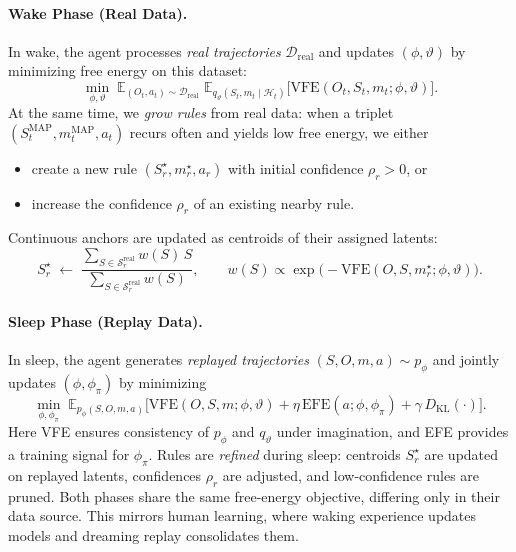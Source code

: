 \documentclass{article} %
\begin{document}
\paragraph{Wake Phase (Real Data).}
In wake, the agent processes \emph{real trajectories} $\mathcal D_{\mathrm{real}}$ and updates 
$(\phi,\vartheta)$ by minimizing free energy on this dataset:
{\small\[
\min_{\phi,\vartheta}\; 
\mathbb{E}_{(O_t,a_t)\sim \mathcal D_{\mathrm{real}}}\;
\mathbb{E}_{q_\vartheta(S_t,m_t\mid \mathcal H_t)}
\big[\text{VFE}(O_t,S_t,m_t;\phi,\vartheta)\big].
\]}
At the same time, we \emph{grow rules} from real data: when a triplet 
$(S_t^{\mathrm{MAP}}, m_t^{\mathrm{MAP}}, a_t)$ recurs often and yields low free energy, we either  
\begin{itemize}
\item[(i)] create a new rule $(S_r^\star, m_r^\star, a_r)$ with initial confidence $\rho_r>0$, or  
\item[(ii)] increase the confidence $\rho_r$ of an existing nearby rule.  
\end{itemize}

Continuous anchors are updated as centroids of their assigned latents:
{\small\[
S_r^\star \;\leftarrow\; 
\frac{\sum_{S \in \mathcal S_r^{\mathrm{real}}} w(S)\,S}
     {\sum_{S \in \mathcal S_r^{\mathrm{real}}} w(S)},
\qquad
w(S) \propto \exp\!\big(-\text{VFE}(O,S,m_r^\star;\phi,\vartheta)\big).
\]}
\paragraph{Sleep Phase (Replay Data).}
In sleep, the agent generates \emph{replayed trajectories} $(S,O,m,a)\sim p_\phi$ and jointly updates 
$(\phi,\phi_\pi)$ by minimizing
{\small \[
\min_{\phi,\phi_\pi}\; 
\mathbb{E}_{p_\phi(S,O,m,a)}\Big[ 
\text{VFE}(O,S,m;\phi,\vartheta) + \eta\,\text{EFE}(a;\phi,\phi_\pi) 
+ \gamma\, D_{\mathrm{KL}}(\cdot) \Big].
\]}
Here VFE ensures consistency of $p_\phi$ and $q_\vartheta$ under imagination, and EFE provides a training 
signal for $\phi_\pi$.  
Rules are \emph{refined} during sleep: centroids $S_r^\star$ are updated on replayed latents, confidences 
$\rho_r$ are adjusted, and low-confidence rules are pruned. Both phases share the same free-energy objective, differing only in their data source.  
This mirrors human learning, where waking experience updates models and dreaming replay consolidates them.  
\end{document}
